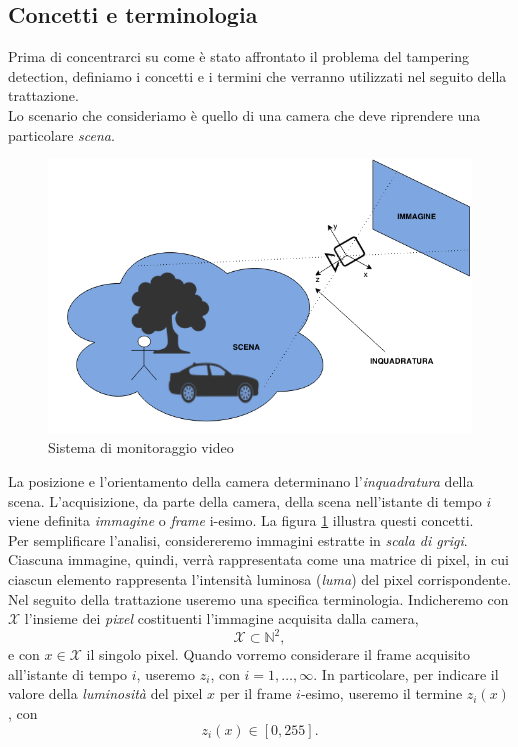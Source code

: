 \subsection{Concetti e terminologia}
Prima di concentrarci su come \`e stato affrontato il problema del tampering detection, definiamo i concetti e i termini che verranno utilizzati nel seguito della trattazione.\\
Lo scenario che consideriamo \`e quello di una camera che deve riprendere una particolare \textit{\gls{scena}}.
\begin{figure}
	\centering
	\includegraphics[width=12cm]{./pictures/videoMonitoring}
	\caption{Sistema di monitoraggio video}
	\label{fig:videoMonitoring}
\end{figure}
\noindent 
La posizione e l'orientamento della camera determinano l'\textit{\gls{inquadratura}} della scena.
L'acquisizione, da parte della camera, della scena nell'istante di tempo $i$ viene definita \textit{immagine} o \textit{frame} i-esimo.
La figura \ref{fig:videoMonitoring} illustra questi concetti.\\
Per semplificare l'analisi, considereremo immagini estratte in \textit{scala di grigi}.
Ciascuna immagine, quindi, verr\`a rappresentata come una matrice di pixel, in cui ciascun elemento rappresenta l'intensit\`a luminosa (\textit{luma}) del pixel corrispondente.\\
Nel seguito della trattazione useremo una specifica terminologia.
Indicheremo con $\mathcal{X}$ l'insieme dei \textit{pixel} costituenti l'immagine acquisita dalla camera,
\[ \mathcal{X} \subset \mathbb{N}^2, \]
e con $x \in \mathcal{X}$ il singolo pixel.
Quando vorremo considerare il frame acquisito all'istante di tempo $i$, useremo $z_i$, con $i=1,\dots , \infty$. 
In particolare, per indicare il valore della \textit{luminosit\`a} del pixel $x$ per il frame $i$-esimo, useremo il termine $z_i(x)$, con 
\[ z_i(x) \in [0, 255]. \]


